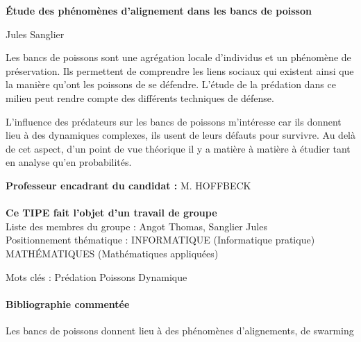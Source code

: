 \documentclass[a4paper]{article}
\begin{document}

\Large
 \begin{center}
\textbf{Étude des phénomènes d'alignement dans les bancs de poisson}\\ 

\hspace{10pt}

\large
Jules Sanglier \\

\hspace{10pt}

\end{center}

\hspace{10pt}

\normalsize

\begin{flushleft}
Les bancs de poissons sont une agrégation locale d'individus et un phénomène de préservation. Ils permettent de comprendre les liens sociaux qui existent ainsi que la manière qu'ont les poissons de se défendre. L'étude de la prédation dans ce milieu peut rendre compte des différents techniques de défense.
\end{flushleft}

\begin{flushleft}
L'influence des prédateurs sur les bancs de poissons m'intéresse car ils donnent lieu à des dynamiques complexes, ils usent de leurs défauts pour survivre. Au delà de cet aspect, d'un point de vue théorique il y a matière à matière à étudier tant en analyse qu'en probabilités.
\end{flushleft}

\textbf{Professeur encadrant du candidat :} M. HOFFBECK\\\\
\textbf{Ce TIPE fait l'objet d'un travail de groupe}\\
Liste des membres du groupe : Angot Thomas, Sanglier Jules\\

Positionnement thématique :
INFORMATIQUE (Informatique pratique)
MATHÉMATIQUES (Mathématiques appliquées)

Mots clés :
Prédation
Poissons
Dynamique

\paragraph{Bibliographie commentée}

Les bancs de poissons donnent lieu à des phénomènes d'alignements, de swarming 
\end{document}
